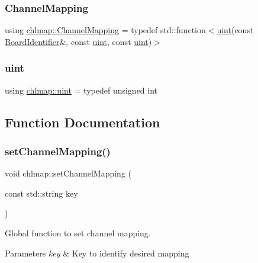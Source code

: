 \subsubsection{\texorpdfstring{Channel\+Mapping}{ChannelMapping}}
{\footnotesize\ttfamily using \hyperlink{namespacechlmap_a5bb86fec567a6f1a0646881a9284bb01}{chlmap\+::\+Channel\+Mapping} = typedef std\+::function$<$\hyperlink{namespacechlmap_a51093e4e5b1ccf24696e04d671728200}{uint}(const \hyperlink{class_board_identifier}{Board\+Identifier}\&, const \hyperlink{namespacechlmap_a51093e4e5b1ccf24696e04d671728200}{uint}, const \hyperlink{namespacechlmap_a51093e4e5b1ccf24696e04d671728200}{uint})$>$}

\mbox{\label{namespacechlmap_a51093e4e5b1ccf24696e04d671728200}} 
\subsubsection{\texorpdfstring{uint}{uint}}
{\footnotesize\ttfamily using \hyperlink{namespacechlmap_a51093e4e5b1ccf24696e04d671728200}{chlmap\+::uint} = typedef unsigned int}



\subsection{Function Documentation}
\mbox{\label{namespacechlmap_a945bd413e64427712373da77277dd443}} 
\subsubsection{\texorpdfstring{set\+Channel\+Mapping()}{setChannelMapping()}}
{\footnotesize\ttfamily void chlmap\+::set\+Channel\+Mapping (\begin{DoxyParamCaption}\item[{const std\+::string}]{key }\end{DoxyParamCaption})}



Global function to set channel mapping. 


\begin{DoxyParams}{Parameters}
{\em key} & Key to identify desired mapping \\
\hline
\end{DoxyParams}


